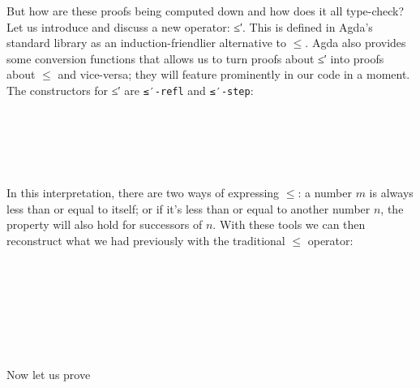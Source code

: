 {But how are these proofs being computed down and how does it all type-check? Let us introduce and discuss a new operator: ≤′. This is defined in Agda's standard library as an induction-friendlier alternative to $\le$. Agda also provides some conversion functions that allows us to turn proofs about ≤′ into proofs about $\le$ and vice-versa; they will feature prominently in our code in a moment. The constructors for ≤′ are \texttt{≤′-refl} and \texttt{≤′-step}:

\begin{code}%
\>[0]\<%
\\
%
\\[\AgdaEmptyExtraSkip]%
\>[0]\<%
\\
\>[0]\<%
\\
\>[0]\<%
\end{code}

In this interpretation, there are two ways of expressing $\le$: a number $m$ is always less than or equal to itself; or if it's less than or equal to another number $n$, the property will also hold for successors of $n$. With these tools we can then reconstruct what we had previously with the traditional $\le$ operator:

\begin{code}%
\>[0]\<%
\\
\>[0]\<%
\\
\>[0]\<%
\\
%
\\[\AgdaEmptyExtraSkip]%
\>[0]\<%
\\
\>[0]\<%
\\
\>[0]\<%
\end{code}

Now let us prove

\begin{code}%
\>[0]\AgdaSpace{}%
\AgdaSymbol{:}\AgdaSpace{}%
\AgdaSpace{}%
\AgdaSpace{}%
\AgdaSpace{}%
\AgdaSpace{}%
\AgdaSpace{}%
\AgdaSpace{}%
\AgdaSpace{}%
\AgdaOperator{\AgdaPrimitive{+}}\AgdaSpace{}%
\<%
\end{code}

}
